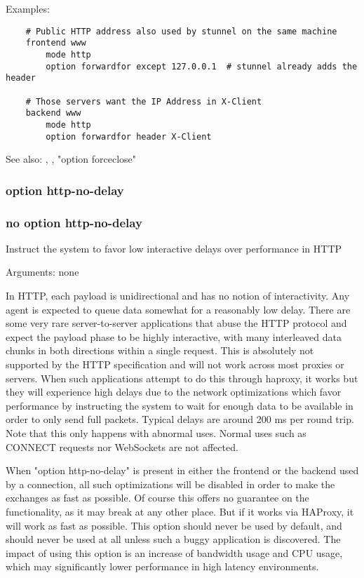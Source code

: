   Examples:
\begin{verbatim}
    # Public HTTP address also used by stunnel on the same machine
    frontend www
        mode http
        option forwardfor except 127.0.0.1  # stunnel already adds the header

    # Those servers want the IP Address in X-Client
    backend www
        mode http
        option forwardfor header X-Client
\end{verbatim}

  See also: , ,
             "option forceclose"

\subsubsection{option http-no-delay}
\subsubsection{no option http-no-delay}


  Instruct the system to favor low interactive delays over performance in HTTP


  Arguments: none

  In HTTP, each payload is unidirectional and has no notion of interactivity.
  Any agent is expected to queue data somewhat for a reasonably low delay.
  There are some very rare server-to-server applications that abuse the HTTP
  protocol and expect the payload phase to be highly interactive, with many
  interleaved data chunks in both directions within a single request. This is
  absolutely not supported by the HTTP specification and will not work across
  most proxies or servers. When such applications attempt to do this through
  haproxy, it works but they will experience high delays due to the network
  optimizations which favor performance by instructing the system to wait for
  enough data to be available in order to only send full packets. Typical
  delays are around 200 ms per round trip. Note that this only happens with
  abnormal uses. Normal uses such as CONNECT requests nor WebSockets are not
  affected.

  When "option http-no-delay" is present in either the frontend or the backend
  used by a connection, all such optimizations will be disabled in order to
  make the exchanges as fast as possible. Of course this offers no guarantee on
  the functionality, as it may break at any other place. But if it works via
  HAProxy, it will work as fast as possible. This option should never be used
  by default, and should never be used at all unless such a buggy application
  is discovered. The impact of using this option is an increase of bandwidth
  usage and CPU usage, which may significantly lower performance in high
  latency environments.

